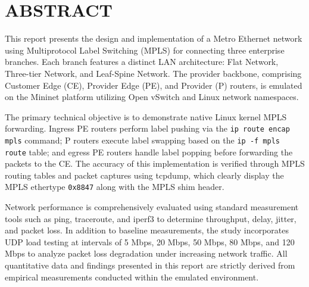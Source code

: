 \section*{ABSTRACT}
 {}

This report presents the design and implementation of a Metro Ethernet network using Multiprotocol Label Switching (MPLS) for connecting three enterprise branches. Each branch features a distinct LAN architecture: Flat Network, Three-tier Network, and Leaf-Spine Network. The provider backbone, comprising Customer Edge (CE), Provider Edge (PE), and Provider (P) routers, is emulated on the Mininet platform utilizing Open vSwitch and Linux network namespaces.

The primary technical objective is to demonstrate native Linux kernel MPLS forwarding. Ingress PE routers perform label pushing via the \texttt{ip route encap mpls} command; P routers execute label swapping based on the \texttt{ip -f mpls route} table; and egress PE routers handle label popping before forwarding the packets to the CE. The accuracy of this implementation is verified through MPLS routing tables and packet captures using tcpdump, which clearly display the MPLS ethertype \texttt{0x8847} along with the MPLS shim header.

Network performance is comprehensively evaluated using standard measurement tools such as ping, traceroute, and iperf3 to determine throughput, delay, jitter, and packet loss. In addition to baseline measurements, the study incorporates UDP load testing at intervals of 5 Mbps, 20 Mbps, 50 Mbps, 80 Mbps, and 120 Mbps to analyze packet loss degradation under increasing network traffic. All quantitative data and findings presented in this report are strictly derived from empirical measurements conducted within the emulated environment.

\newpage
